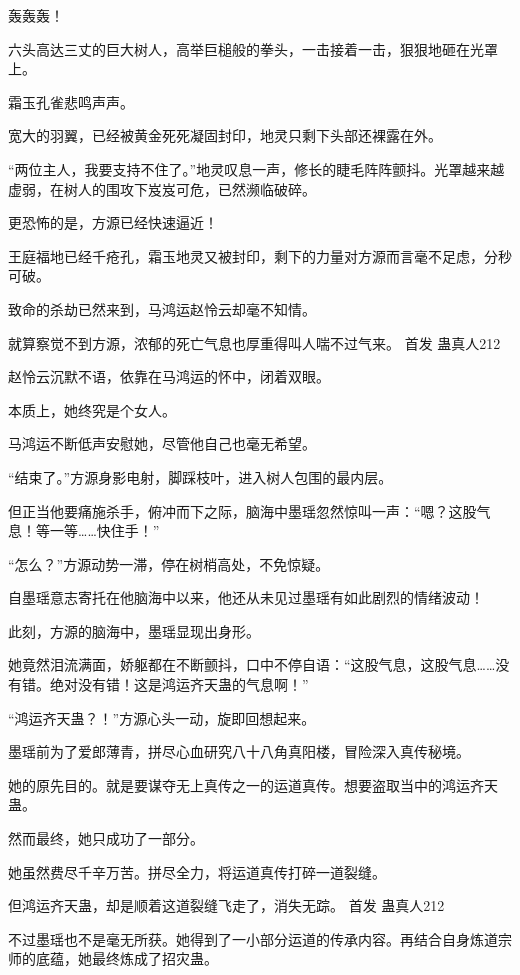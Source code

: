 
\begin{this_body}

轰轰轰！

六头高达三丈的巨大树人，高举巨槌般的拳头，一击接着一击，狠狠地砸在光罩上。

霜玉孔雀悲鸣声声。

宽大的羽翼，已经被黄金死死凝固封印，地灵只剩下头部还裸露在外。

“两位主人，我要支持不住了。”地灵叹息一声，修长的睫毛阵阵颤抖。光罩越来越虚弱，在树人的围攻下岌岌可危，已然濒临破碎。

更恐怖的是，方源已经快速逼近！

王庭福地已经千疮孔，霜玉地灵又被封印，剩下的力量对方源而言毫不足虑，分秒可破。

致命的杀劫已然来到，马鸿运赵怜云却毫不知情。

就算察觉不到方源，浓郁的死亡气息也厚重得叫人喘不过气来。  首发 蛊真人212

赵怜云沉默不语，依靠在马鸿运的怀中，闭着双眼。

本质上，她终究是个女人。

马鸿运不断低声安慰她，尽管他自己也毫无希望。

“结束了。”方源身影电射，脚踩枝叶，进入树人包围的最内层。

但正当他要痛施杀手，俯冲而下之际，脑海中墨瑶忽然惊叫一声：“嗯？这股气息！等一等……快住手！”

“怎么？”方源动势一滞，停在树梢高处，不免惊疑。

自墨瑶意志寄托在他脑海中以来，他还从未见过墨瑶有如此剧烈的情绪波动！

此刻，方源的脑海中，墨瑶显现出身形。

她竟然泪流满面，娇躯都在不断颤抖，口中不停自语：“这股气息，这股气息……没有错。绝对没有错！这是鸿运齐天蛊的气息啊！”

“鸿运齐天蛊？！”方源心头一动，旋即回想起来。

墨瑶前为了爱郎薄青，拼尽心血研究八十八角真阳楼，冒险深入真传秘境。

她的原先目的。就是要谋夺无上真传之一的运道真传。想要盗取当中的鸿运齐天蛊。

然而最终，她只成功了一部分。

她虽然费尽千辛万苦。拼尽全力，将运道真传打碎一道裂缝。

但鸿运齐天蛊，却是顺着这道裂缝飞走了，消失无踪。  首发 蛊真人212

不过墨瑶也不是毫无所获。她得到了一小部分运道的传承内容。再结合自身炼道宗师的底蕴，她最终炼成了招灾蛊。


\end{this_body}
